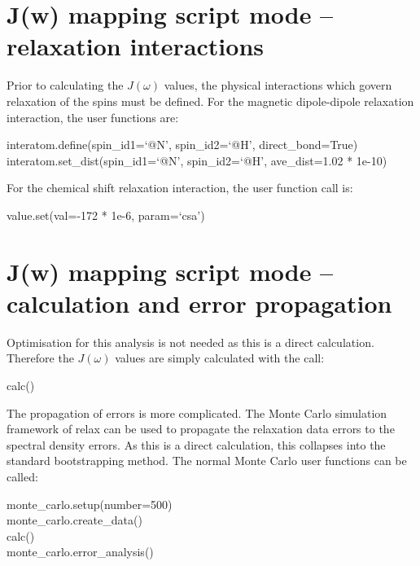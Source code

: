 
\section{J(w) mapping script mode -- relaxation interactions}

Prior to calculating the $J(\omega)$ values, the physical interactions which govern relaxation of the spins must be defined.  For the magnetic dipole-dipole relaxation interaction, the user functions are:

\begin{exampleenv}
interatom.define(spin\_id1=`@N', spin\_id2=`@H', direct\_bond=True) \\
interatom.set\_dist(spin\_id1=`@N', spin\_id2=`@H', ave\_dist=1.02 * 1e-10)
\end{exampleenv}

For the chemical shift relaxation interaction, the user function call is:

\begin{exampleenv}
value.set(val=-172 * 1e-6, param=`csa')
\end{exampleenv}




\section{J(w) mapping script mode -- calculation and error propagation}

Optimisation for this analysis is not needed as this is a direct calculation.  Therefore the $J(\omega)$ values are simply calculated with the call:

\begin{exampleenv}
calc()
\end{exampleenv}

The propagation of errors is more complicated.  The Monte Carlo simulation framework of relax can be used to propagate the relaxation data errors to the spectral density errors.  As this is a direct calculation, this collapses into the standard bootstrapping method.  The normal Monte Carlo user functions can be called:

\begin{exampleenv}
monte\_carlo.setup(number=500) \\
monte\_carlo.create\_data() \\
calc() \\
monte\_carlo.error\_analysis()
\end{exampleenv}

